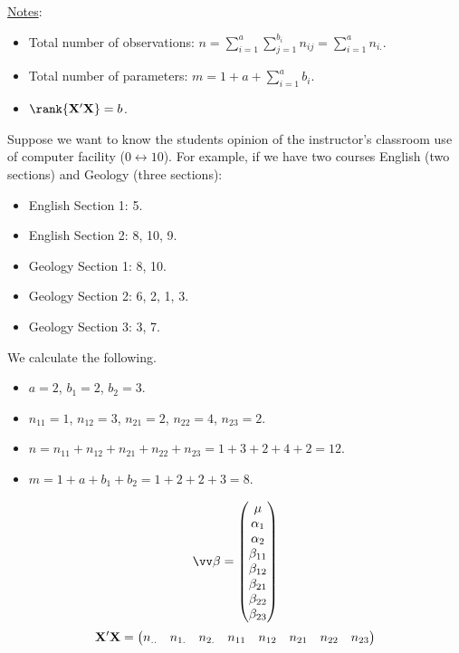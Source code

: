 \underline{Notes}:
\begin{itemize}
    \item Total number of observations: $ n=\sum_{i=1}^{a}\sum_{j=1}^{b_i}n_{ij}=\sum_{i=1}^{a}n_{i.} $.
    \item Total number of parameters: $ m=1+a+\sum_{i=1}^{a}b_i $.
    \item $ \rank{\Matrix{X}'\Matrix{X}}=b $.
\end{itemize}
\begin{Example}{}{}
    Suppose we want to know the students opinion of the instructor's
    classroom use of computer facility ($ 0\leftrightarrow 10 $).
    For example, if we have two courses English (two sections) and Geology (three sections):
    \begin{itemize}
        \item English Section 1: 5.
        \item English Section 2: 8, 10, 9.
        \item Geology Section 1: 8, 10.
        \item Geology Section 2: 6, 2, 1, 3.
        \item Geology Section 3: 3, 7.
    \end{itemize}
    We calculate the following.
    \begin{itemize}
        \item $ a=2 $, $ b_1=2 $, $ b_2=3 $.
        \item $ n_{11}=1 $, $ n_{12}=3 $, $ n_{21}=2 $, $ n_{22}=4 $, $ n_{23}=2 $.
        \item $ n=n_{11}+n_{12}+n_{21}+n_{22}+n_{23}=1+3+2+4+2=12 $.
        \item $ m=1+a+b_1+b_2=1+2+2+3=8 $.
    \end{itemize}
    \[ \Vector{\beta}=\begin{pmatrix}
            \mu        \\
            \alpha_1   \\
            \alpha_2   \\
            \beta_{11} \\
            \beta_{12} \\
            \beta_{21} \\
            \beta_{22} \\
            \beta_{23}
        \end{pmatrix} \]
    \[ \mathbf{X}'\mathbf{X}=\begin{pmatrix}
            n_{..} & n_{1.} & n_{2.} & n_{11} & n_{12} & n_{21} & n_{22} & n_{23} \\

\end{pmatrix}\]
\end{Example}
